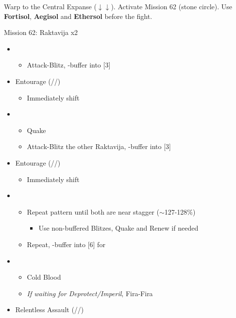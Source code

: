 \renewcommand{\first}{[1] Relentless Assault (\com/\rav/\rav)}
\renewcommand{\second}{[2] Diversity (\com/\rav/\med)}
\renewcommand{\third}{[3] Entourage (\rav/\sen/\med)}

Warp to the Central Expanse ($\downarrow\downarrow$).
Activate Mission 62 (stone circle).
Use \textbf{Fortisol}, \textbf{Aegisol} and \textbf{Ethersol} before the fight.

\begin{battle}{Mission 62: Raktavija x2}
	\begin{itemize}
		\item \fourth
			\begin{itemize}
				\item Attack-Blitz, \rav-buffer into [3]
			\end{itemize}
		\item \third
			\begin{itemize}
				\item Immediately shift
			\end{itemize}
		\item \fourth
			\begin{itemize}
				\item Quake
				\item Attack-Blitz the other Raktavija, \rav-buffer into [3]
			\end{itemize}
		\item \third
			\begin{itemize}
				\item Immediately shift
			\end{itemize}
		\item \fourth
			\begin{itemize}
				\item Repeat pattern until both are near stagger ($\sim$127-128\%)
					\begin{itemize}
						\item Use non-buffered Blitzes, Quake and Renew if needed
					\end{itemize}
				\item Repeat, \rav-buffer into [6] for \stagger
			\end{itemize}
		\item \sixth
			\begin{itemize}
				\item Cold Blood
				\item \textit{If waiting for Deprotect/Imperil}, Fira-Fira
			\end{itemize}
		\item \first

\end{itemize}
\end{battle}
